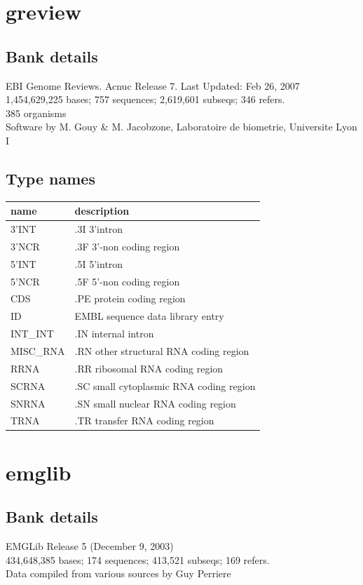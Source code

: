 \documentclass{article}
\begin{document}
\begin{Schunk}
\section{ greview }
\subsection{Bank details}
EBI Genome Reviews. Acnuc Release 7. Last Updated: Feb 26, 2007\\
1,454,629,225 bases; 757 sequences; 2,619,601 subseqs; 346 refers.\\
385 organisms\\
Software by M. Gouy \& M. Jacobzone, Laboratoire de biometrie, Universite Lyon I

\subsection{Type names}
\noindent\begin{tabular}{ll}
\hline \hline
name & description\\
\hline
3'INT & .3I 3'intron \\
3'NCR & .3F  3'-non coding region \\
5'INT & .5I 5'intron \\
5'NCR & .5F  5'-non coding region \\
CDS & .PE protein coding region \\
ID & EMBL sequence data library entry \\
INT\_INT & .IN  internal intron \\
MISC\_RNA & .RN other structural RNA coding region \\
RRNA & .RR ribosomal RNA coding region \\
SCRNA & .SC small cytoplasmic RNA coding region \\
SNRNA & .SN small nuclear RNA coding region \\
TRNA & .TR transfer RNA coding region \\
\hline \hline
\end{tabular}

\section{ emglib }
\subsection{Bank details}
EMGLib Release 5 (December 9, 2003)\\
434,648,385 bases; 174 sequences; 413,521 subseqs; 169 refers.\\
Data compiled from various sources by Guy Perriere


\end{Schunk}
\end{document}
